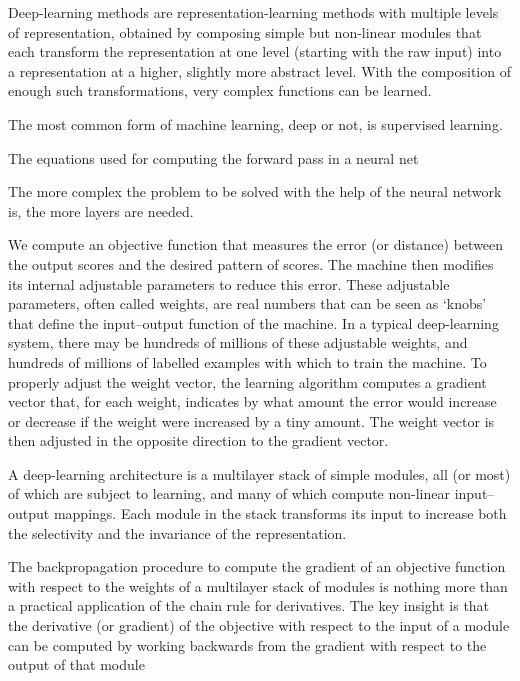 Deep-learning methods are representation-learning methods with multiple levels of representation, obtained by composing simple but non-linear modules that each transform the representation at one level (starting with the raw input) into a representation at a higher, slightly more abstract level. With the composition of enough such transformations, very complex functions can be learned.

The most common form of machine learning, deep or not, is supervised learning.

The equations used for computing the forward pass in a neural net



The more complex the problem to be solved with the help of the neural network is, the more layers are needed. 

We compute an objective function that measures the error (or distance) between the output scores and the desired pattern of scores. The machine then modifies its internal adjustable parameters to reduce  this error. These adjustable parameters, often called weights, are real numbers that can be seen as ‘knobs’ that define the input–output function of the machine. In a typical deep-learning system, there may be hundreds of millions of these adjustable weights, and hundreds of millions of labelled examples with which to train the machine. To properly adjust the weight vector, the learning algorithm computes a gradient vector that, for each weight, indicates by what amount the error would increase or decrease if the weight were increased by a tiny amount. The weight vector is then adjusted in the opposite direction to the gradient vector. 

A deep-learning architecture is a multilayer stack of simple modules, all (or most) of which are subject to learning, and many of which compute non-linear input–output mappings. Each module in the stack transforms its input to increase both the selectivity and the invariance of the representation.

The backpropagation procedure to compute the gradient of an objective function with respect to the weights of a multilayer stack of modules is nothing more than a practical application of the chain rule for derivatives. The key insight is that the derivative (or gradient) of the objective with respect to the input of a module can be computed by working backwards from the gradient with respect to the output of that module

